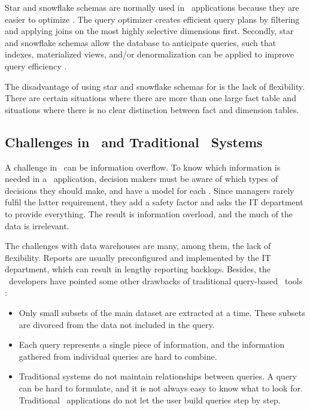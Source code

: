Star and snowflake schemas are normally used in \bi~applications because they are easier to optimize \cite{Lamb2012-kg}. The query optimizer creates efficient query plans by filtering and applying joins on the most highly selective dimensions first. Secondly, star and snowflake schemas allow the database to anticipate queries, such that indexes, materialized views, and/or denormalization can be applied to improve query efficiency \cite{Barber2012-xt}.

The disadvantage of using star and snowflake schemas for \bi is the lack of flexibility. There are certain situations where there are more than one large fact table and situations where there is no clear distinction between fact and dimension tables.

\subsection{Challenges in \bi~and Traditional \bi~Systems} 
\label{sub:Challenges in Business Intelligence and Traditional Business Intelligence Systems}
A challenge in \bi~can be information overflow. To know which information is needed in a \bi~application, decision makers must be aware of which types of decisions they should make, and have a model for each \cite{Ackoff1999-wk}. Since managers rarely fulfil the latter requirement, they add a safety factor and asks the IT department to provide everything. The result is information overload, and the much of the data is irrelevant. 

The challenges with data warehouses are many, among them, the lack of flexibility. Reports are usually preconfigured and implemented by the IT department, which can result in lengthy reporting backlogs. Besides, the \qlikview~developers have pointed some other drawbacks of traditional query-based \bi~tools \cite{Qlik2010-ya}:
\begin{itemize}
  \item Only small subsets of the main dataset are extracted at a time. These subsets are divorced from the data not included in the query.
  \item Each query represents a single piece of information, and the information gathered from individual queries are hard to combine.
  \item Traditional systems do not maintain relationships between queries. A query can be hard to formulate, and it is not always easy to know what to look for. Traditional \bi~applications do not let the user build queries step by step.
\end{itemize}

